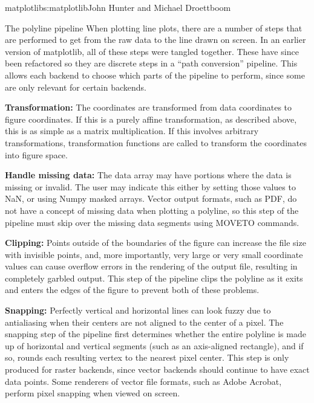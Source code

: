 \begin{aosachapter}{matplotlib}{s:matplotlib}{John Hunter and Michael Droettboom}
\begin{aosasect1}{The polyline pipeline}
When plotting line plots, there are a number of steps that are
performed to get from the raw data to the line drawn on screen.  In an
earlier version of matplotlib, all of these steps were tangled
together.  These have since been refactored so they are discrete steps
in a ``path conversion'' pipeline.  This allows each backend to choose
which parts of the pipeline to perform, since some are only relevant
for certain backends.

\begin{aosaenumerate}

\item \textbf{Transformation:} The coordinates are transformed from data
  coordinates to figure coordinates.  If this is a purely affine
  transformation, as described above, this is as simple as a matrix
  multiplication.  If this involves arbitrary transformations,
  transformation functions are called to transform the coordinates
  into figure space.

\item \textbf{Handle missing data:} The data array may have portions
  where the data is missing or invalid.  The user may indicate this
  either by setting those values to NaN, or using Numpy masked arrays.
  Vector output formats, such as PDF, do not have a concept of missing
  data when plotting a polyline, so this step of the pipeline must
  skip over the missing data segments using MOVETO commands.

\item \textbf{Clipping:} Points outside of the boundaries of the
  figure can increase the file size with invisible points, and, more
  importantly, very large or very small coordinate values can cause
  overflow errors in the rendering of the output file, resulting in
  completely garbled output.  This step of the pipeline clips the
  polyline as it exits and enters the edges of the figure to prevent
  both of these problems.

\item \textbf{Snapping:} Perfectly vertical and horizontal lines can
  look fuzzy due to antialiasing when their centers are not aligned to
  the center of a pixel.  The snapping step of the pipeline first
  determines whether the entire polyline is made up of horizontal and
  vertical segments (such as an axis-aligned rectangle), and if so,
  rounds each resulting vertex to the nearest pixel center.  This step
  is only produced for raster backends, since vector backends should
  continue to have exact data points.  Some renderers of vector file
  formats, such as Adobe Acrobat, perform pixel snapping when viewed
  on screen.


\end{aosaenumerate}
\end{aosasect1}
\end{aosachapter}
